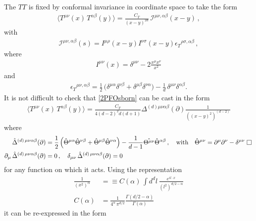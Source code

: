 \documentclass[a4paper,11pt,openright,twoside]{book}
\def\nbox#1#2{\vcenter{\hrule \hbox{\vrule height#2in
			\kern#1in \vrule} \hrule}}
\def\sq{\,\raise.5pt\hbox{$\nbox{.09}{.09}$}\,}
\def\Box{\sq}
\numberwithin{equation}{section}
\begin{document}
{{The $TT$ is fixed by conformal invariance in coordinate space to take the form 
\begin{align}
	\label{2PFOsborn}
	\langle T^{\mu \nu}(x) \, T^{\alpha \beta} (y)\rangle =
	\frac{C_T}{(x-y)^{2d}} \, \mathcal{I}^{\mu\nu ,\alpha\beta}(x-y) \, ,
\end{align}
with 
\begin{align} \label{Inversion}
	\mathcal{I}^{\mu \nu,\alpha \beta} (s) =
	I^{\mu\rho}(x-y)I^{\nu\sigma}(x-y) {\epsilon_T}^{\rho\sigma,\alpha\beta} \, ,
\end{align}
where
\begin{align}
	I^{\mu\nu}(x)=
	\delta^{\mu\nu} - 2 \frac{x^\mu x^\nu}{x^2}
\end{align}
and 
\begin{align}\label{epsilon}
	{\epsilon_T}^{\mu\nu,\alpha\beta} =
	\frac{1}{2} \, (\delta^{\mu\alpha} \delta^{\nu \beta} + \delta^{\mu \beta} \delta^{\nu \alpha} \bigl)
	- \frac{1}{d} \, \delta^{\mu \nu} \delta^{\alpha \beta}.
\end{align}
It is not difficult to check that \eqref{2PFOsborn} can be cast in the form 
\begin{align}
	\langle T^{\mu \nu}(x) \, T^{\alpha \beta} (y)\rangle =
	\frac{C_T}{4 (d-2)^2 d (d+1)} \Delta^{(d) \mu\nu\alpha\beta}(\partial) \frac{1}{((x-y)^2)^{(d-2)}}
\end{align}
where 
\begin{align} \label{TransverseDeltaCoord}
	\hat{\Delta}^{(d)\,\mu\nu\alpha\beta}(\partial)
	&=
	\frac{1}{2}\left( \hat{\Theta}^{\mu\alpha} \hat{\Theta}^{\nu\beta} +\hat{ \Theta}^{\mu\beta}\hat{ \Theta}^{\nu\alpha} \right)
	- \frac{1}{d-1}\hat{ \Theta^{\mu\nu}} \hat{\Theta}^{\alpha\beta}\, ,
	\quad
	\text{with}
	\quad
	\hat{\Theta}^{\mu\nu} = \partial^\mu  \partial^\nu - \delta^{\mu\nu} \, \Box  \notag\\
	\partial_\mu \, \hat{\Delta}^{(d)\,\mu\nu\alpha\beta}(\partial)
	&=
	0 \, , \quad
	\delta_{\mu\nu} \, \hat{\Delta}^{(d)\,\mu\nu\alpha\beta}(\partial) = 0   \, 
\end{align}
for any function on which it acts.
%
Using the representation 
\begin{align} \label{fund}
	\frac{1}{(x^2)^\alpha}&=\equiv C(\alpha) \, \int d^d l \, \frac{e^{i l\cdot x}}{(l^2)^{d/2 - \alpha}} \nonumber \\
	C(\alpha) &=\frac{1}{4^{\alpha}\,\pi^{d/2}} \frac{\Gamma(d/2 - \alpha)}{\Gamma(\alpha)}
\end{align}
it can be re-expressed in the form 

}}
\end{document}
